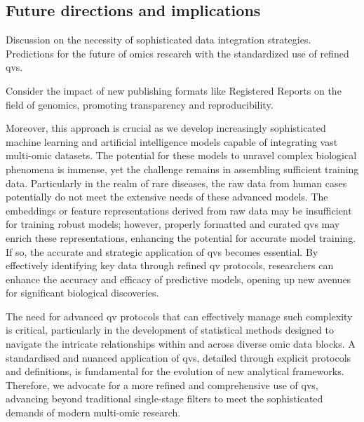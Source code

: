 \subsection{Future directions and implications} 

Discussion on the necessity of sophisticated data integration strategies. Predictions for the future of omics research with the standardized use of refined \ac{qv}s.

Consider the impact of new publishing formats like Registered Reports on the field of genomics, promoting transparency and reproducibility.
\cite{chambers2014instead}

Moreover, this approach is crucial as we develop increasingly sophisticated machine learning and artificial intelligence models capable of integrating vast multi-omic datasets. The potential for these models to unravel complex biological phenomena is immense, yet the challenge remains in assembling sufficient training data. Particularly in the realm of rare diseases, the raw data from human cases potentially do not meet the extensive needs of these advanced models. The embeddings or feature representations derived from raw data may be insufficient for training robust models; however, properly formatted and curated \ac{qv}s may enrich these representations, enhancing the potential for accurate model training. If so, the accurate and strategic application of \ac{qv}s becomes essential. By effectively identifying key data through refined \ac{qv} protocols, researchers can enhance the accuracy and efficacy of predictive models, opening up new avenues for significant biological discoveries.

The need for advanced \ac{qv} protocols that can effectively manage such complexity is critical, particularly in the development of statistical methods designed to navigate the intricate relationships within and across diverse omic data blocks. A standardised and nuanced application of \ac{qv}s, detailed through explicit protocols and definitions, is fundamental for the evolution of new analytical frameworks. Therefore, we advocate for a more refined and comprehensive use of \ac{qv}s, advancing beyond traditional single-stage filters to meet the sophisticated demands of modern multi-omic research. 

